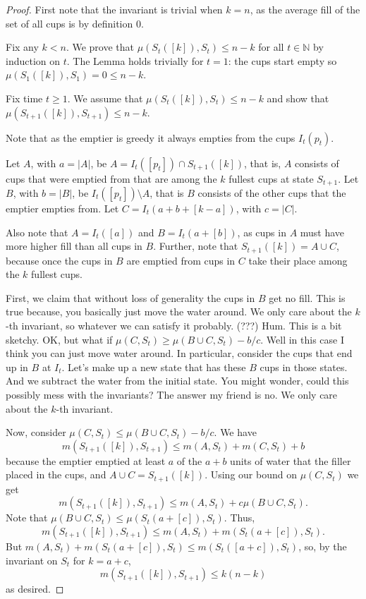 \documentclass[twocolumn]{article}[11pt]
\begin{document}
\begin{proof}
  First note that the invariant is trivial when $k=n$, as the average fill of the set of all cups is by definition $0$.

  Fix any $k < n$. We prove that $\mu(S_t([k]), S_t)\le n-k$ for all $t\in\mathbb{N}$ by induction on $t$.
  The Lemma holds trivially for $t=1$: the cups start empty so $\mu(S_1([k]), S_1) = 0 \le n-k$.

  Fix time $t \ge 1$. We assume that $\mu(S_t([k]), S_t) \le n-k$ and show
  that $\mu(S_{t+1}([k]), S_{t+1}) \le n-k$. 

  Note that as the emptier is greedy it always empties from the cups $I_t(p_t)$.

  Let $A$, with $a=|A|$, be $A = I_t([p_t]) \cap S_{t+1}([k])$, that is, $A$
  consists of cups that were emptied from that are among the $k$ fullest
  cups at state $S_{t+1}$.
  Let $B$, with $b=|B|$, be $I_t([p_t]) \setminus A$, that is $B$ consists of
  the other cups that the emptier empties from. 
  Let $C = I_t(a+b+[k-a])$, with $c=|C|$.

  Also note that $A = I_t([a])$ and $B = I_t(a+[b])$, as cups in $A$
  must have more higher fill than all cups in $B$.
  Further, note that $S_{t+1}([k]) = A \cup C$, because once the cups in $B$
  are emptied from cups in $C$ take their place among the $k$ fullest cups.

First, we claim that without loss of generality the cups in $B$ get no fill.
This is true because, you basically just move the water around. We only care
about the $k$-th invariant, so whatever we can satisfy it probably. (???)
Hum. This is a bit sketchy.
OK, but what if $\mu(C, S_t) \ge \mu(B\cup C, S_t) - b/c$.
Well in this case I think you can just move water around.
In particular, consider the cups that end up in $B$ at $I_t$. 
Let's make up a new state that has these $B$ cups in those states. And we
subtract the water from the initial state. You might wonder, could this
possibly mess with the invariants? The answer my friend is no. We only care
about the $k$-th invariant.

Now, consider $\mu(C, S_t) \le \mu(B\cup C, S_t) - b/c$.
We have
$$m(S_{t+1}([k]), S_{t+1}) \le m(A, S_t) + m(C, S_t) + b$$
because the emptier emptied at least $a$ of the $a+b$ units of water that the
filler placed in the cups, and $A \cup C = S_{t+1}([k])$.
Using our bound on $\mu(C, S_t)$ we get
$$m(S_{t+1}([k]), S_{t+1}) \le m(A, S_t) + c\mu(B\cup C, S_t).$$
Note that $\mu(B\cup C, S_t) \le \mu(S_t(a+[c]), S_t)$.
Thus, 
$$m(S_{t+1}([k]), S_{t+1}) \le m(A, S_t) + m(S_t(a+[c]), S_t).$$
But $m(A, S_t) + m(S_t(a+[c]), S_t) \le m(S_t([a+c]), S_t)$, so, by the invariant on $S_t$ for $k=a+c$, 
$$m(S_{t+1}([k]), S_{t+1}) \le k(n-k)$$
as desired.

\end{proof}
\clearpage
\end{document}
